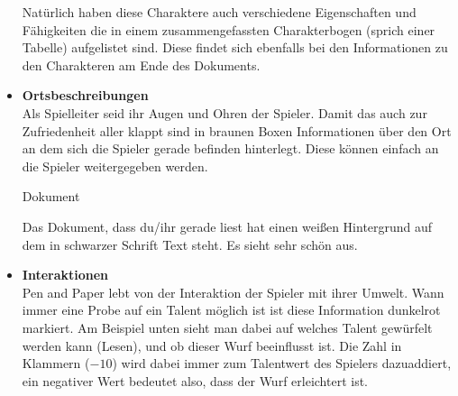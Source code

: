 \begin{itemize}
  \vspace{16pt}
  \hspace{-0.7cm}
  \begin{centering}
    \noindent{}
  \end{centering}

  Natürlich haben diese Charaktere auch verschiedene Eigenschaften und Fähigkeiten die in einem zusammengefassten Charakterbogen (sprich einer Tabelle)
  aufgelistet sind. Diese findet sich ebenfalls bei den Informationen zu den Charakteren am Ende des Dokuments.

  

  \item \textcolor{BrownBoxFrame}{\textbf{Ortsbeschreibungen}} \\
  Als Spielleiter seid ihr Augen und Ohren der Spieler. Damit das auch zur Zufriedenheit aller klappt sind in \textcolor{BrownBoxFrame}{braunen}
  Boxen Informationen über den Ort an dem sich die Spieler gerade befinden hinterlegt. Diese können einfach an die Spieler weitergegeben werden.

  \begin{place-box}{Dokument}

  Das Dokument, dass du/ihr gerade liest hat einen weißen Hintergrund auf dem in schwarzer Schrift Text steht. Es sieht sehr schön aus.

  \end{place-box}

  \item \textcolor{RedBoxFrame}{\textbf{Interaktionen}} \\
  Pen and Paper lebt von der \textcolor{RedBoxFrame}{Interaktion} der Spieler mit ihrer Umwelt. Wann immer eine Probe auf ein Talent
  möglich ist ist diese Information \textcolor{RedBoxFrame}{dunkelrot} markiert. Am Beispiel unten sieht man dabei auf welches Talent
  gewürfelt werden kann (Lesen), und ob dieser Wurf beeinflusst ist. Die Zahl in Klammern ($-10$) wird dabei immer zum Talentwert
  des Spielers dazuaddiert, ein negativer Wert bedeutet also, dass der Wurf erleichtert ist.


\end{itemize}
